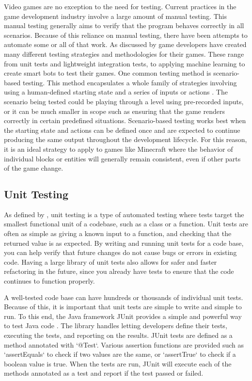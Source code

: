 \documentclass{article}
\begin{document}
\begin{onehalfspacing}
Video games are no exception to the need for testing. Current practices
in the game development industry involve a large amount of manual
testing. This manual testing generally aims to verify that the program
behaves correctly in all scenarios. Because of this reliance on manual
testing, there have been attempts to automate some or all of that work.
As discussed by \textcite{politowski2021survey} game developers have created
many different testing strategies and methodologies for their games.
These range from unit tests and lightweight integration tests, to
applying machine learning to create smart bots to test their games. One
common testing method is scenario-based testing. This method
encapsulates a whole family of strategies involving using a
human-defined starting state and a series of inputs or actions
\parencite{albaghajati2020video}. 
The scenario being tested could be playing
through a level using pre-recorded inputs, or it can be much smaller in
scope such as ensuring that the game renders correctly in certain
predefined situations. Scenario-based testing works best when the
starting state and actions can be defined once and are expected to
continue producing the same output throughout the development lifecycle.
For this reason, it is an ideal strategy to apply to games like
Minecraft where the behavior of individual blocks or entities will
generally remain consistent, even if other parts of the game change.

\subsection{Unit Testing}

As defined by \textcite{Huizinga2007}, unit testing is a type of automated
testing where tests target the smallest functional unit of a codebase,
such as a class or a function. Unit tests are often as simple as giving
a known input to a function, and checking that the returned value is as
expected. By writing and running unit tests for a code base, you can
help verify that future changes do not cause bugs or errors in existing
code. Having a large library of unit tests also allows for safer and
faster refactoring in the future, since you already have tests to ensure
that the code continues to function properly.

A well-tested code base can have hundreds or thousands of individual
unit tests. Because of this, it is important that unit tests are simple
to write and simple to run. To this end, the Java framework JUnit
provides a simple and powerful way to test Java code \parencite{rakshith2020comprehensive}. 
The library handles letting developers define their
tests, executing the tests, and reporting on the results. JUnit tests
are defined as a method annotated with `@Test`. Various assertion
functions are provided such as `assertEquals` to check if two values are
the same, or `assertTrue` to check if a boolean value is true. When the
tests are run, JUnit will execute each of the methods annotated as a
test and report if the test passed or failed.


\end{onehalfspacing}
\end{document}
